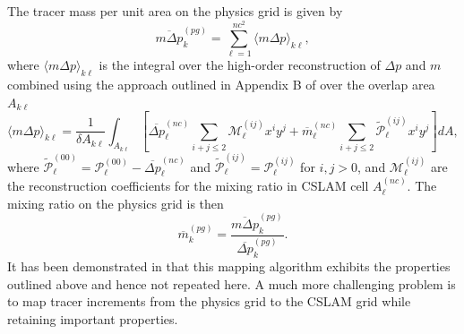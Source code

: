 The tracer mass per unit area on the physics grid is given by
\begin{equation}
\label{eq:mp}
\overline{m\Delta p}^{(pg)}_k=\sum_{\ell=1}^{nc^2}\langle m\Delta p\rangle_{k\ell},
\end{equation}
where $\langle m\Delta p\rangle_{k\ell}$ is the integral over the high-order reconstruction of $\Delta p$ and $m$ combined using the approach outlined in Appendix B of \cite{NL2010JCP} over the overlap area $A_{k\ell}$
\begin{equation}
\label{eq:mp2}
\langle m\Delta p\rangle_{k\ell}=\frac{1}{\delta A_{k\ell}}\int_{A_{k\ell}}\left[ \overline{\Delta p}_\ell^{(nc)}\sum_{i+j\le 2}{\mathcal{M}}^{(ij)}_\ell x^{i}y^{j}+{\overline{m}}_\ell^{(nc)}\sum_{i+j\le 2}{\widetilde{{\mathcal{P}}}}^{(ij)}_\ell x^{i}y^{j}\right] dA,
\end{equation}
where ${\widetilde{{\mathcal{P}}}}^{(00)}_\ell={\mathcal{P}}^{(00)}_\ell-\overline{\Delta p}^{(nc)}_\ell$ and ${\widetilde{{\mathcal{P}}}}^{(ij)}_\ell={\mathcal{P}}^{(ij)}_\ell$ for $i,j>0$, and ${\mathcal{M}}^{(ij)}_\ell$ are the reconstruction coefficients for the mixing ratio in CSLAM cell $A^{(nc)}_\ell$. The mixing ratio on the physics grid is then
\begin{equation}
\overline{m}^{(pg)}_k=\frac{\overline{m\Delta p}^{(pg)}_k}{\overline{\Delta p}^{(pg)}_k}.
\end{equation}
It has been demonstrated in  \cite{LNU2010JCP} that this mapping algorithm exhibits the properties outlined above and hence not repeated here. A much more challenging problem is to map tracer increments from the physics grid to the CSLAM grid while retaining important properties.
